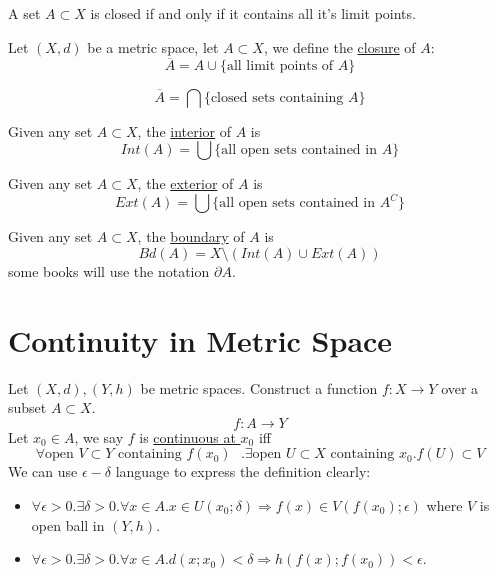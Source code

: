 \begin{theorem}
    A set $A \subset X$ is closed if and only if it contains all it's limit points.
\end{theorem}

\begin{definition}
    Let $(X,d)$ be a metric space, let $A \subset X$, we define the \underline{closure} of $A$:
    $$\overline{A}=A \cup \{\text{all limit points of } A\}$$
\end{definition}

\begin{lemma}
    $$\overline{A}=\bigcap \{\text{closed sets containing $A$}\}$$
\end{lemma}

\begin{definition}
    Given any set $A \subset X$, the \underline{interior} of $A$ is 
    $$Int(A)=\bigcup \{\text{all open sets contained in $A$}\}$$
\end{definition}

\begin{definition}
    Given any set $A \subset X$, the \underline{exterior} of $A$ is 
    $$Ext(A)=\bigcup \{\text{all open sets contained in $A^C$}\}$$
\end{definition}

\begin{definition}
    Given any set $A \subset X$, the \underline{boundary} of $A$ is 
    $$Bd(A)= X\setminus(Int(A) \cup Ext(A))$$ 
    some books will use the notation $\partial A$.
\end{definition}

\section{Continuity in Metric Space}

\begin{definition}
    Let $(X,d),(Y,h)$ be metric spaces. Construct a function $f:X \longrightarrow Y$ over a subset $A \subset X$. 
    $$f:A \longrightarrow Y$$
    Let $x_0 \in A$, we say $f$ is \underline{continuous at $x_0$} iff 
    $$\forall \text{open $V \subset Y$ containing $f(x_0)$ }. \exists \text{open }U \subset X \text{ containing }x_0. f(U) \subset V $$
    We can use $\epsilon - \delta$ language to express the definition clearly:
    \begin{itemize}
        \item $\forall \epsilon>0. \exists \delta >0. \forall x \in A. x \in U(x_0;\delta) \Longrightarrow f(x) \in V(f(x_0);\epsilon)$ where $V$ is open ball in $(Y,h)$.
        \item $\forall \epsilon>0. \exists \delta >0. \forall x \in A. d(x;x_0)<\delta \Longrightarrow h(f(x);f(x_0))<\epsilon$.
    \end{itemize}
\end{definition}

